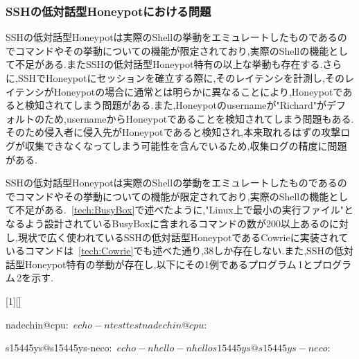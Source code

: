 \subsubsection{SSHの低対話型Honeypotにおける問題}
\label{approach:problemofSshLowHoneypot}
SSHの低対話型Honeypotは実際のShellの挙動をエミュレートしたものであるのでコマンドやその挙動についての機能が限定されており,実際のShellの機能として不足がある.またSSHの低対話型Honeypot特有の以上な挙動も存在する.さらに,SSHでHoneypotにセッションを確立する際に,そのレイテンシを計測し,そのレイテンシがHoneypotの場合に通常とは明らかに異なることにより,Honeypotであると検知されてしまう問題がある.また,Honeypotのusernameが"Richard"がデフォルトのため,usernameからHoneypotであることを検知されてしまう問題もある.そのため侵入者に侵入先がHoneypotであると検知され,本来取れるはずの攻撃ログが収集できなくなってしまう可能性を含んでいるため,収集ログの精度に問題がある.

\label{approach:LowHoneypotLatency}

\label{approach:LowHoneypotUsername}

\label{approach:LowHoneypotCommand}
SSHの低対話型Honeypotは実際のShellの挙動をエミュレートしたものであるのでコマンドやその挙動についての機能が限定されており,実際のShellの機能として不足がある.~\ref{tech:BusyBox}で述べたように,"Linux上で最小の実行ファイル"となるよう設計されているBusyBoxに含まれるコマンドの数が200以上あるのに対し,現状で広く使われているSSHの低対話型HoneypotであるCowrieに実装されているコマンドは~\ref{tech:Cowrie}でも述べた通り,38しか存在しない.また,SSHの低対話型Honeypot特有の挙動が存在し,以下にその1例であるプログラム\,1とプログラム\,2を示す.

\vspace{5mm}
[1][]
    {\lstset{
        frame=single,
        basicstyle=\ttfamily,
        numbers=left,
        numbersep=10pt,
        tabsize=2,
        extendedchars=true,
        xleftmargin=17pt,
        framexleftmargin=17pt,
        #1
    }
}{}

\begin{mylisting}[language=sh,caption=正しいShellの挙動]
nadechin@cpu:~$ echo -n test
testnadechin@cpu:~$
\end{mylisting}

\begin{mylisting}[language=sh,caption=Kippo特有の異常な挙動の例]
s15445ys@s15445ys-neco:~$ echo -n hello
-n hello
s15445ys@s15445ys-neco:~$
\end{mylisting}

